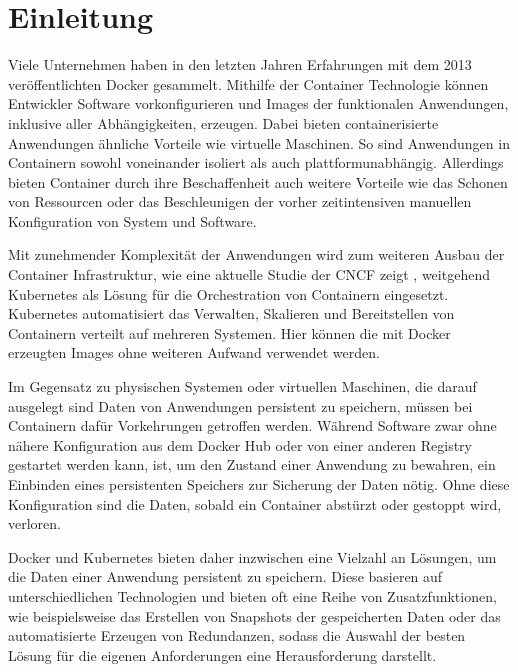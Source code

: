 \chapter{Einleitung}
\label{cha:einleitung}
Viele Unternehmen haben in den letzten Jahren Erfahrungen mit dem 2013 veröffentlichten Docker \cite{doc:release} gesammelt. Mithilfe der Container Technologie können Entwickler Software vorkonfigurieren und Images der funktionalen Anwendungen, inklusive aller Abhängigkeiten, erzeugen. Dabei bieten containerisierte Anwendungen ähnliche Vorteile wie virtuelle Maschinen. So sind Anwendungen in Containern sowohl voneinander isoliert als auch plattformunabhängig. Allerdings bieten Container durch ihre Beschaffenheit auch weitere Vorteile wie das Schonen von Ressourcen oder das Beschleunigen der vorher zeitintensiven manuellen Konfiguration von System und Software. \medskip


Mit zunehmender Komplexität der Anwendungen wird zum weiteren Ausbau der Container Infrastruktur, wie eine aktuelle Studie der \ac{CNCF} zeigt \cite{kube:survey}, weitgehend Kubernetes als Lösung für die Orchestration von Containern eingesetzt. Kubernetes automatisiert das Verwalten, Skalieren und Bereitstellen von Containern verteilt auf mehreren Systemen. Hier können die mit Docker erzeugten Images ohne weiteren Aufwand verwendet werden. \medskip

Im Gegensatz zu physischen Systemen oder virtuellen Maschinen, die darauf ausgelegt sind Daten von Anwendungen persistent zu speichern, müssen bei Containern dafür Vorkehrungen getroffen werden. Während Software zwar ohne nähere Konfiguration aus dem Docker Hub oder von einer anderen Registry gestartet werden kann, ist, um den Zustand einer Anwendung zu bewahren, ein Einbinden eines persistenten Speichers zur Sicherung der Daten nötig. Ohne diese Konfiguration sind die Daten, sobald ein Container abstürzt oder gestoppt wird, verloren. \medskip

Docker und Kubernetes bieten daher inzwischen eine Vielzahl an Lösungen, um die Daten einer Anwendung persistent zu speichern. Diese basieren auf unterschiedlichen Technologien und bieten oft eine Reihe von Zusatzfunktionen, wie beispielsweise das Erstellen von Snapshots der gespeicherten Daten oder das automatisierte Erzeugen von Redundanzen, sodass die Auswahl der besten Lösung für die eigenen Anforderungen eine Herausforderung darstellt.

%
%

